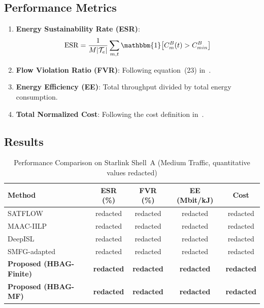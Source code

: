\documentclass[journal]{IEEEtran}
\newcommand{\CB}{C^{B}}
\newcommand{\CBmin}{C^{B}_{min}}
\begin{document}
\subsection{Performance Metrics}

\begin{enumerate}
    \item \textbf{Energy Sustainability Rate (ESR)}:
    \begin{equation}
        \mathrm{ESR} =
        \frac{1}{M|\mathcal{T}_e|}
        \sum_{m,t}
        \mathbbm{1}\!\left[
        \CB_m(t) > \CBmin\right]
    \end{equation}
    \item \textbf{Flow Violation Ratio (FVR)}:
Following equation~(23) in~\cite{cen2024satflow}.
    \item \textbf{Energy Efficiency (EE)}:
Total throughput divided by total energy consumption.
    \item \textbf{Total Normalized Cost}:
Following the cost definition in~\cite{cen2024satflow}.
\end{enumerate}

\subsection{Results}

\begin{table}[t]
\centering
\caption{Performance Comparison on Starlink Shell~A
(Medium Traffic, quantitative values redacted)}
\label{tab:results}
\renewcommand{\arraystretch}{1.2}
\begin{tabular}{lcccc}
\toprule
\textbf{Method} & \textbf{ESR (\%)} &
\textbf{FVR (\%)} &
\textbf{EE (Mbit/kJ)} &
\textbf{Cost} \\
\midrule
SATFLOW & redacted & redacted & redacted & redacted \\
MAAC-IILP & redacted & redacted & redacted & redacted \\
DeepISL & redacted & redacted & redacted & redacted \\
SMFG-adapted & redacted & redacted & redacted & redacted \\
\textbf{Proposed (HBAG-Finite)} & \textbf{redacted} & \textbf{redacted} & \textbf{redacted} & \textbf{redacted} \\
\textbf{Proposed (HBAG-MF)} & \textbf{redacted} & \textbf{redacted} & \textbf{redacted} & \textbf{redacted} \\
\bottomrule
\end{tabular}
\end{table}
\end{document}
